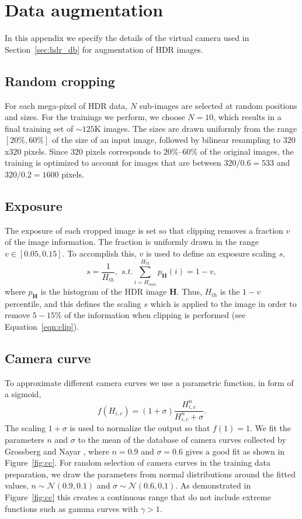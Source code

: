 \documentclass[acmtog]{acmart}
\newcommand{\figref}[1]{Figure~\ref{fig:#1}}
\newcommand{\eqnref}[1]{Equation~\ref{eqn:#1}}
\newcommand{\secref}[1]{Section~\ref{sec:#1}}
\newcommand{\vect}[1]{\boldsymbol{#1}}
\newcommand{\hdrp}{H}
\newcommand{\hdr}{\vect{\hdrp}}
\newcommand{\cc}{f}
\newcommand\customsection[1]{\subsection{#1}}
\begin{document}
\appendix
\section{Data augmentation}\label{app:augmentation}
In this appendix we specify the details of the virtual camera used in \secref{hdr_db} for augmentation of HDR images.

\customsection{Random cropping}
For each mega-pixel of HDR data, $N$ sub-images are selected at random positions and sizes.  For the trainings we perform, we choose $N=10$, which results in a final training set of $\sim\!\!125$K images. The sizes are drawn uniformly from the range $[20\%,60\%]$ of the size of an input image, followed by bilinear resampling to $320$x$320$ pixels. Since $320$ pixels corresponds to $20\%$--$60\%$ of the original images, the training is optimized to account for images that are between $320/0.6 = 533$ and $320/0.2 = 1600$ pixels.

\customsection{Exposure}
The exposure of each cropped image is set so that clipping removes a fraction $v$ of the image information. The fraction is uniformly drawn in the range $v\in[0.05,0.15]$. To accomplish this, $v$ is used to define an exposure scaling $s$,
\begin{equation}
s = \frac{1}{\hdrp_{th}}, \,\, s.t. \sum_{i = \hdrp_{min}}^{\hdrp_{th}}{p_{\hdr}(i)} = 1-v,
\end{equation}
where $p_{\hdr}$ is the histogram of the HDR image $\hdr$.  Thus, $\hdrp_{th}$ is the $1-v$ percentile, and this defines the scaling $s$ which is applied to the image in order to remove $5-15\%$ of the information when clipping is performed (see \eqnref{clip}).

\customsection{Camera curve}
To approximate different camera curves we use a parametric function, in form of a sigmoid,
\begin{equation}
\cc(\hdrp_{i,c}) = (1+\sigma) \frac{\hdrp_{i,c}^n}{\hdrp_{i,c}^n + \sigma}.
\label{eqn:cc}
\end{equation}
The scaling $1+\sigma$ is used to normalize the output so that $\cc(1) = 1$. We fit the parameters $n$ and $\sigma$ to the mean of the database of camera curves collected by Grossberg and Nayar \citeyear{Grossberg2003}, where $n = 0.9$ and $\sigma = 0.6$ gives a good fit as shown in \figref{cc}. For random selection of camera curves in the training data preparation, we draw the parameters from normal distributions around the fitted values, $n \sim \mathcal{N}(0.9,0.1)$ and $\sigma \sim \mathcal{N}(0.6,0.1)$. As demonstrated in \figref{cc} this creates a continuous range that do not include extreme functions such as gamma curves with $\gamma > 1$.
\end{document}
